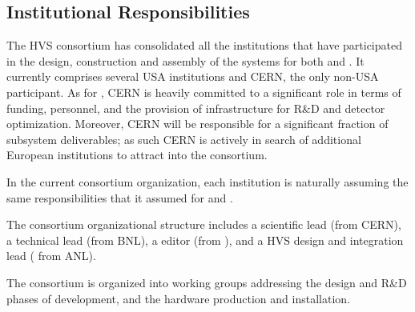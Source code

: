 \subsection{Institutional Responsibilities}
\label{sec:fdsp-hv-org-consortium}
The HVS consortium has consolidated 
all the institutions that have participated in the design, construction and assembly of the  systems for both   and . 
%
It currently comprises several USA institutions and CERN, %
the only non-USA participant. As %
for , CERN is heavily committed to a significant role in terms of funding, personnel, 
 and the provision of infrastructure for R\&D and detector optimization. Moreover, CERN will be responsible for a significant fraction of subsystem deliverables; as such  CERN is actively in search of additional European institutions to attract into the consortium. 
 
 In the  current consortium organization, each institution is naturally assuming the same responsibilities that it assumed for %
 and .

The %
consortium organizational structure 
 includes a scientific lead (from CERN), a technical lead (from BNL), a  editor (from \fnal), and a HVS design and integration lead ( from ANL). 

 The consortium is organized into working groups addressing the design and  R\&D phases of development, and the hardware production and installation.

